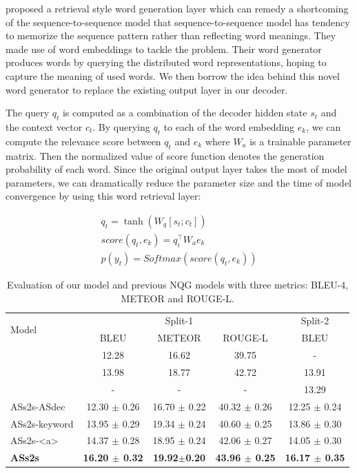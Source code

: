 \documentclass[letterpaper]{article} %
\newcommand\Tstrut{\rule{0pt}{2.3ex}}         %
\begin{document}
\cite{ma2018query} proposed a retrieval style word generation layer which can remedy a shortcoming of the sequence-to-sequence model that sequence-to-sequence model has tendency to memorize the sequence pattern rather than reflecting word meanings. They made use of word embeddings to tackle the problem. Their word generator produces words by querying the distributed word representations, hoping to capture the meaning of used words. We then borrow the idea behind this novel word generator to replace the existing output layer in our decoder.

The query \(q_t\) is computed as a combination of the decoder hidden state \(s_t\) and the context vector \(c_t\). By querying \(q_t\) to each of the word embedding \(e_k\), we can compute the relevance score between \(q_t\) and \(e_k\) where \(W_a\) is a trainable parameter matrix. Then the normalized value of score function denotes the generation probability of each word. Since the original output layer takes the most of model parameters, we can dramatically reduce the parameter size and the time of model convergence by using this word retrieval layer:

\begin{gather}
q_t = \tanh(W_q[s_t;c_t]) \label{eq_18} \\
score(q_t, e_k) = q^\top_iW_ae_k \label{eq_19} \\
p(y_t) = Softmax(score(q_t, e_k)) \label{eq_20}
\end{gather}

\begin{table}[!htb]
\centering
\begin{tabular}{|l|ccc|c|}
\hline
\multirow{2}{*}{Model} & \multicolumn{3}{c|}{Split-1} & Split-2\Tstrut  \\ \cline{2-5} 
 & BLEU & METEOR & ROUGE-L & BLEU\Tstrut \\  \hline
\cite{du2017learning} & 12.28 & 16.62 & 39.75 & - \Tstrut  \\
\cite{song2018leveraging} & 13.98 & 18.77 & 42.72 & 13.91  \\
\cite{zhou2017neural} & - & - & - & 13.29  \\ \hline
ASs2s-ASdec & 12.30 $\pm$ 0.26 & 16.70 $\pm$ 0.22 & 40.32 $\pm$ 0.26 & 12.25 $\pm$ 0.24 \Tstrut \\
ASs2s-keyword & 13.95 $\pm$ 0.29 & 19.34 $\pm$ 0.24 & 40.60 $\pm$ 0.25& 13.86 $\pm$ 0.30 \Tstrut \\
ASs2s-\textless a\textgreater{} & 14.37 $\pm$ 0.28 & 18.95 $\pm$ 0.24 & 42.06 $\pm$ 0.27 & 14.05 $\pm$ 0.30\Tstrut  \\
\textbf{ASs2s} & \textbf{16.20 $\pm$ 0.32} & \textbf{19.92$\pm$0.20} & \textbf{43.96 $\pm$ 0.25} & \textbf{16.17 $\pm$ 0.35}\Tstrut  \\ 
\hline
\end{tabular}%
\caption{Evaluation of our model and previous NQG models with three metrics: BLEU-4, METEOR and ROUGE-L.}
\label{table:evaluation}
\end{table}
\end{document}
